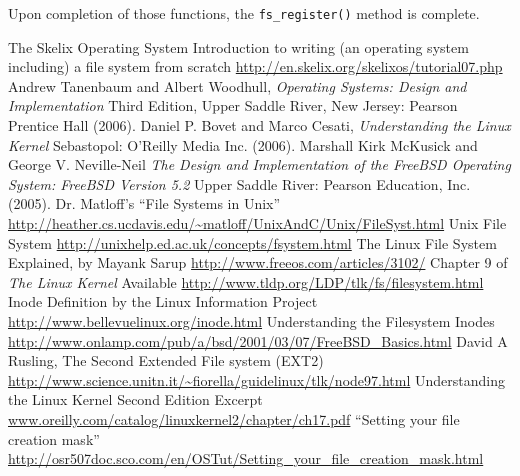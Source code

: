 \documentclass{article}
\begin{document}
Upon completion of those functions, the \verb|fs_register()| method is complete.

\begin{thebibliography}{10}
 The Skelix Operating System Introduction to writing (an operating system including) a file system from scratch \url{http://en.skelix.org/skelixos/tutorial07.php}
 Andrew Tanenbaum and Albert Woodhull, \textit{Operating Systems: Design and Implementation} Third Edition, Upper Saddle River, New Jersey: Pearson Prentice Hall (2006).
 Daniel P. Bovet and Marco Cesati, \textit{Understanding the Linux Kernel} Sebastopol: O'Reilly Media Inc. (2006).
 Marshall Kirk McKusick and George V. Neville-Neil \textit{The Design and Implementation of the FreeBSD Operating System: FreeBSD Version 5.2} Upper Saddle River: Pearson Education, Inc. (2005).
 Dr. Matloff's ``File Systems in Unix'' \url{http://heather.cs.ucdavis.edu/~matloff/UnixAndC/Unix/FileSyst.html} 
 Unix File System \url{http://unixhelp.ed.ac.uk/concepts/fsystem.html}
 The Linux File System Explained, by Mayank Sarup \url{http://www.freeos.com/articles/3102/}
 Chapter 9 of \textit{The Linux Kernel} Available \url{http://www.tldp.org/LDP/tlk/fs/filesystem.html}
 Inode Definition by the Linux Information Project \url{http://www.bellevuelinux.org/inode.html}
 Understanding the Filesystem Inodes \url{http://www.onlamp.com/pub/a/bsd/2001/03/07/FreeBSD_Basics.html}
 David A Rusling, The Second Extended File system (EXT2) \url{http://www.science.unitn.it/~fiorella/guidelinux/tlk/node97.html}
 Understanding the Linux Kernel Second Edition Excerpt \url{www.oreilly.com/catalog/linuxkernel2/chapter/ch17.pdf}
 ``Setting your file creation mask'' \url{http://osr507doc.sco.com/en/OSTut/Setting_your_file_creation_mask.html}
\end{thebibliography}
\end{document}
